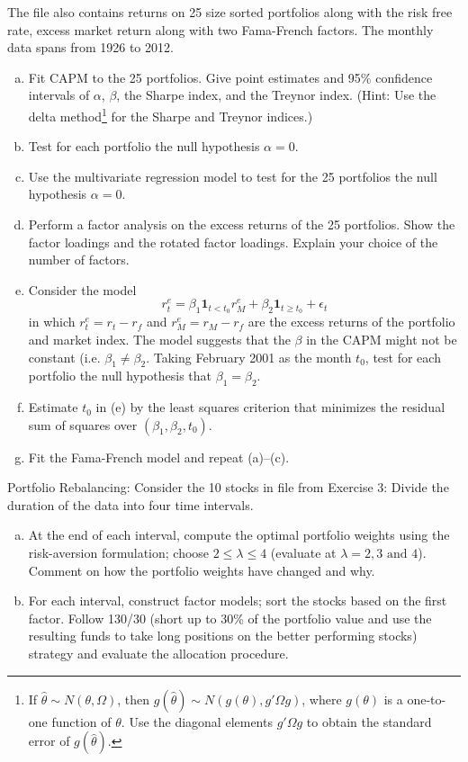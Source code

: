 \prob The file  also contains returns on 25 size sorted portfolios along with the risk free rate, excess market return along with two Fama-French factors. The monthly data spans from 1926 to 2012.
	\begin{enumerate}[(a)]
	\item Fit CAPM to the 25 portfolios. Give point estimates and 95\% confidence intervals of $\alpha$, $\beta$, the Sharpe index, and the Treynor index. (Hint: Use the delta method\footnote{If $\hat{\theta} \sim N(\theta,\Omega)$, then $g(\hat{\theta}) \sim N(g(\theta),g'\Omega g)$, where $g(\theta)$ is a one-to-one function of $\theta$. Use the diagonal elements $g' \Omega g$ to obtain the standard error of $g(\hat{\theta})$.} for the Sharpe and Treynor indices.)
	\item Test for each portfolio the null hypothesis $\alpha= 0$.
	\item Use the multivariate regression model to test for the 25 portfolios the null hypothesis $\alpha=0$.
	\item Perform a factor analysis on the excess returns of the 25 portfolios. Show the factor loadings and the rotated factor loadings. Explain your choice of the number of factors.
	\item Consider the model
		\[
		r_t^e= \beta_1 \mathbf{1}_{t<t_0} r_M^e + \beta_2 \mathbf{1}_{t\geq t_0} + \epsilon_t
		\]
	in which $r_t^e=r_t-r_f$ and $r_M^e=r_M-r_f$ are the excess returns of the portfolio and market index. The model suggests that the $\beta$ in the CAPM might not be constant (i.e. $\beta_1\neq\beta_2$. Taking February 2001 as the month $t_0$, test for each portfolio the null hypothesis that $\beta_1=\beta_2$.
	\item Estimate $t_0$ in (e) by the least squares criterion that minimizes the residual sum of squares over $(\beta_1,\beta_2,t_0)$.
	\item Fit the Fama-French model and repeat (a)--(c). \twomedskip
	\end{enumerate}


\prob Portfolio Rebalancing: Consider the 10 stocks in file from Exercise 3: Divide the duration of the data into four time intervals.
    \begin{enumerate}[(a)]
    \item At the end of each interval, compute the optimal portfolio weights using the risk-aversion formulation; choose $2 \leq \lambda \leq 4$ (evaluate at $\lambda = 2, 3 \text{ and } 4$). Comment on how the portfolio weights have changed and why.
    \item For each interval, construct factor models; sort the stocks based on the first factor. Follow 130/30 (short up to 30\% of the portfolio value and use the resulting funds to take long positions on the better performing stocks) strategy and evaluate the allocation procedure. \twomedskip
    \end{enumerate}
    
